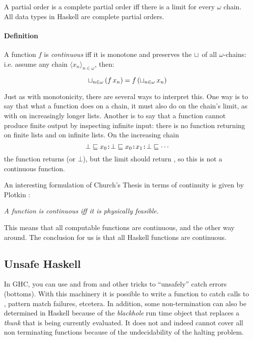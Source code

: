 A partial order is a complete partial order iff there is a limit for
every $\omega$ chain. All data types in Haskell are complete partial
orders.
\begin{comment}
\footnonte{Notice that the data type \hs{data StrictNat = Zero |
    Succ !StrictNat} is flat and therefore complete.}. Now we can
define continuity.
\end{comment}

\paragraph{Definition} A function $f$ is \emph{continuous} iff it is
monotone and preserves the $\sqcup_{ }$ of all $\omega$-chains: i.e.
assume any chain $\langle x_n \rangle_{n \in \omega}$, then:

\begin{equation*}
\sqcup_{n \in \omega} \, (f \, x_n) = f \, (\sqcup_{n \in \omega} \, x_n)
\end{equation*}

Just as with monotonicity, there are several ways to interpret
this. One way is to say that what a function does on a chain, it must
also do on the chain's limit, as with  on increasingly longer
lists. Another is to say that a function cannot produce finite output by
inspecting infinite input: there is no function
 returning  on finite lists and
 on infinite lists. On the increasing chain
$$ \bot \sqsubseteq x_0 \texttt{:} \bot \sqsubseteq x_0 \texttt{:} x_1 \texttt{:} \bot
\sqsubseteq \cdots$$
the function  returns  (or $\bot$), but the
limit should return , so this is not a continuous function.

An interesting formulation of Church's Thesis in terms of continuity
is given by Plotkin \cite{domains}:

\begin{center}
\emph{A function is continuous iff it is physically feasible.}
\end{center}

This means that all computable functions are continuous, and the other
way around. The conclusion for us is that all Haskell functions are
continuous.

\subsection{Unsafe Haskell}
In GHC, you can use  and  from
 and other tricks to ``unsafely'' catch errors
(bottoms). With this machinery it is possible to write a function
 to catch calls to , pattern
match failures, etcetera. In addition, some non-termination can also
be determined in Haskell because of the \emph{blackhole} run time
object that replaces a \emph{thunk} that is being currently
evaluated. It does not and indeed cannot cover all non terminating
functions because of the undecidability of the halting problem.

